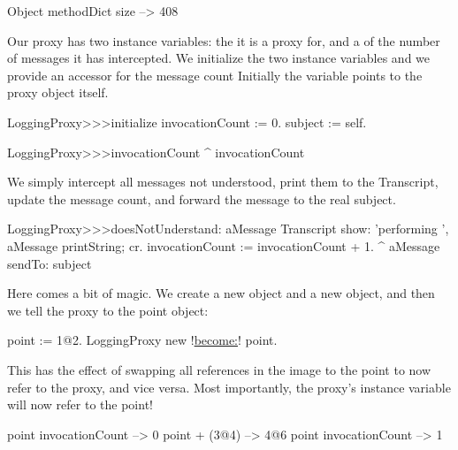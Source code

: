 \documentclass[a4paper,10pt,twoside]{book}
\begin{document}
\begin{code}{}
Object methodDict size --> 408
\end{code}

Our proxy has two instance variables: the  it is a proxy for, and a  of the number of messages it has intercepted.
We initialize the two instance variables and we provide an accessor for the message count
Initially the  variable points to the proxy object itself.
\begin{code}{}
LoggingProxy>>>initialize
	invocationCount := 0.
	subject := self.
\end{code}

\begin{code}{}
LoggingProxy>>>invocationCount
	^ invocationCount
\end{code}

We simply intercept all messages not understood, print them to the Transcript, update the message count, and forward the message to the real subject.
\begin{code}{}
LoggingProxy>>>doesNotUnderstand: aMessage 
	Transcript show: 'performing ', aMessage printString; cr.
	invocationCount := invocationCount + 1.
	^ aMessage sendTo: subject
\end{code}

Here comes a bit of magic.
We create a new  object and a new  object, and then we tell the proxy to  the point object:
\begin{code}{}
point := 1@2.
LoggingProxy new !\underline{become:}! point.
\end{code}

This has the effect of swapping all references in the image to the point to now refer to the proxy, and vice versa. Most importantly, the proxy's  instance variable will now refer to the point!

\begin{code}{}
point invocationCount --> 0
point + (3@4)             --> 4@6
point invocationCount --> 1
\end{code}
\end{document}
